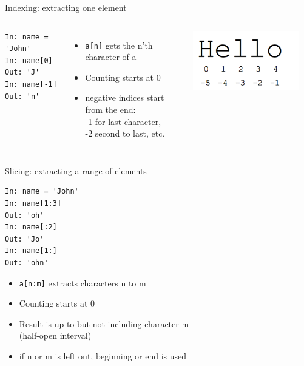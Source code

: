 \documentclass[aspectratio=169,usenames,dvipsnames]{beamer}
\begin{document}
\begin{frame}[fragile]{Indexing: extracting one element}
\begin{columns}
\begin{lstlisting}
In: name = 'John'
In: name[0]
Out: 'J'
In: name[-1]
Out: 'n'
\end{lstlisting}
    \begin{itemize}
        \item \texttt{a[n]} gets the n'th character of a
        \item Counting starts at 0
        \item negative indices start from the end:\\
            -1 for last character, \\
            -2 second to last, etc.
    \end{itemize}
    \includegraphics[width=0.9\textwidth]{fig/indexing}
\end{columns}
\end{frame}

\begin{frame}[fragile]{Slicing: extracting a range of elements}
\begin{lstlisting}
In: name = 'John'
In: name[1:3]
Out: 'oh'
In: name[:2]
Out: 'Jo'
In: name[1:]
Out: 'ohn'
\end{lstlisting}
    \begin{itemize}
        \item \texttt{a[n:m]} extracts characters n to m
        \item Counting starts at 0
        \item Result is up to but not including character m \\
                (half-open interval)
        \item if n or m is left out, beginning or end is used
    \end{itemize}
\end{frame}
\end{document}
